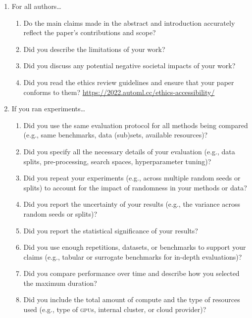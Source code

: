\documentclass[11pt]{article}
\begin{document}
\begin{enumerate}
\item For all authors\dots
  \begin{enumerate}
  \item Do the main claims made in the abstract and introduction accurately
    reflect the paper's contributions and scope?
    \answerTODO{}
  \item Did you describe the limitations of your work?
    \answerTODO{}
  \item Did you discuss any potential negative societal impacts of your work?
    \answerTODO{}
  \item Did you read the ethics review guidelines and ensure that your paper
    conforms to them? \url{https://2022.automl.cc/ethics-accessibility/}
    \answerTODO{}
  \end{enumerate}
\item If you ran experiments\dots
  \begin{enumerate}
  \item Did you use the same evaluation protocol for all methods being compared (e.g.,
    same benchmarks, data (sub)sets, available resources)?
    \answerTODO{}
  \item Did you specify all the necessary details of your evaluation (e.g., data splits,
    pre-processing, search spaces, hyperparameter tuning)?
    \answerTODO{}
  \item Did you repeat your experiments (e.g., across multiple random seeds or splits) to account for the impact of randomness in your methods or data?
    \answerTODO{}
  \item Did you report the uncertainty of your results (e.g., the variance across random seeds or splits)?
    \answerTODO{}
  \item Did you report the statistical significance of your results?
    \answerTODO{}
  \item Did you use enough repetitions, datasets, or benchmarks to support your claims 
    (e.g., tabular or surrogate benchmarks for in-depth evaluations)?
    \answerTODO{}
  \item Did you compare performance over time and describe how you selected the maximum duration?
    \answerTODO{}
  \item Did you include the total amount of compute and the type of resources
    used (e.g., type of \textsc{gpu}s, internal cluster, or cloud provider)?

\end{enumerate}
\end{enumerate}
\end{document}
